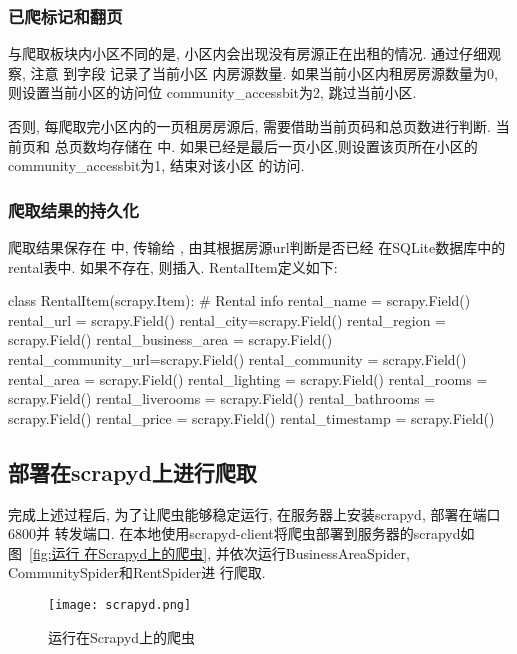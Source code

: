 \subsubsection{已爬标记和翻页}
与爬取板块内小区不同的是, 小区内会出现没有房源正在出租的情况. 通过仔细观察, 注意
到字段  记录了当前小区
内房源数量. 如果当前小区内租房房源数量为0, 则设置当前小区的访问位
community\_accessbit为2, 跳过当前小区.

否则, 每爬取完小区内的一页租房房源后, 需要借助当前页码和总页数进行判断. 当前页和
总页数均存储在 中.
如果已经是最后一页小区,则设置该页所在小区的community\_accessbit为1, 结束对该小区
的访问.

\subsubsection{爬取结果的持久化}
爬取结果保存在 中, 传输给
, 由其根据房源url判断是否已经
在SQLite数据库中的rental表中. 如果不存在, 则插入. RentalItem定义如下:
\begin{python}
    class RentalItem(scrapy.Item):
    # Rental info
    rental_name = scrapy.Field()
    rental_url = scrapy.Field()
    rental_city=scrapy.Field()
    rental_region = scrapy.Field()
    rental_business_area = scrapy.Field()
    rental_community_url=scrapy.Field()
    rental_community = scrapy.Field()
    rental_area = scrapy.Field()
    rental_lighting = scrapy.Field()
    rental_rooms = scrapy.Field()
    rental_liverooms = scrapy.Field()
    rental_bathrooms = scrapy.Field()
    rental_price = scrapy.Field()
    rental_timestamp = scrapy.Field()
\end{python}

\subsection{部署在scrapyd上进行爬取}
完成上述过程后, 为了让爬虫能够稳定运行, 在服务器上安装scrapyd, 部署在端口6800并
转发端口. 在本地使用scrapyd-client将爬虫部署到服务器的scrapyd如图~\ref{fig:运行
在Scrapyd上的爬虫}, 并依次运行BusinessAreaSpider, CommunitySpider和RentSpider进
行爬取.
\begin{figure}[ht!]
    \centering
    \texttt{[image: scrapyd.png]}
    \caption{运行在Scrapyd上的爬虫}
    \label{fig:运行在Scrapyd上的爬虫}
\end{figure}